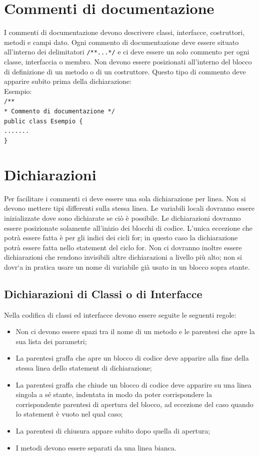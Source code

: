 \documentclass[11pt,titlepage,a4paper]{report}
\begin{document}
\section{Commenti di documentazione}
I commenti di documentazione devono descrivere classi, interfacce, costruttori, metodi e campi dato. Ogni commento di documentazione deve essere situato all'interno dei delimitatori \texttt{/**...*/} e ci deve essere un solo commento per ogni classe, interfaccia o membro. Non devono essere posizionati all'interno del blocco di definizione di un metodo o di un costruttore. Questo tipo di commento deve apparire subito prima della dichiarazione:\\
 \newline
Esempio:\\
 \newline
\texttt{/** \\
* Commento di documentazione \newline
 */ \\
public class Esempio \{ \\
    ....... \\
\}} \\
 \newline
\section{Dichiarazioni}
Per facilitare i commenti ci deve essere una sola dichiarazione per linea. Non si devono mettere tipi differenti sulla stessa linea. Le variabili locali dovranno essere inizializzate dove sono dichiarate se ci\`o \`e possibile. Le dichiarazioni dovranno essere posizionate solamente all'inizio dei blocchi di codice. L'unica eccezione che potr\`a essere fatta è per gli indici dei cicli for; in questo caso la dichiarazione potr\`a essere fatta nello statement del ciclo for. Non ci dovranno inoltre essere dichiarazioni che rendono invisibili altre dichiarazioni a livello più alto; non si dovr`a in pratica usare un nome di variabile già usato in un blocco sopra stante.
\subsection{Dichiarazioni di Classi o di Interfacce}
Nella codifica di classi ed interfacce devono essere seguite le seguenti regole:
\begin{itemize}
\item Non ci devono essere spazi tra il nome di un metodo e le parentesi che apre la sua lista dei parametri;
\item La parentesi graffa che apre un blocco di codice deve apparire alla fine della stessa linea dello statement di dichiarazione;
\item La parentesi graffa che chiude un blocco di codice deve apparire su una linea singola a sé stante, indentata in modo da poter corrispondere la corrispondente parentesi di apertura del blocco, ad eccezione del caso quando lo statement è vuoto nel qual caso;
\item La parentesi di chiusura appare subito dopo quella di apertura;
\item I metodi devono essere separati da una linea bianca.
\end{itemize}
\end{document}
